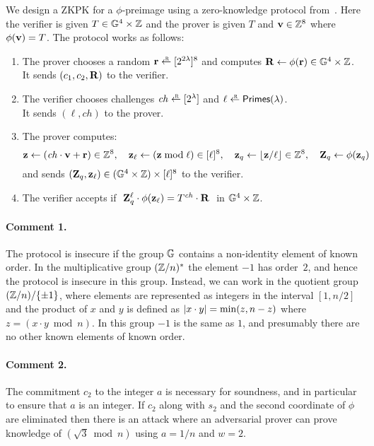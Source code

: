 \documentclass[11pt]{article}
\begin{document}
\begin{itemize}
We design a ZKPK for a $\phi$-preimage 
using a zero-knowledge protocol from~\cite[\S 3.5]{ourpaper}.
Here the verifier is given $T \in \mathbb G^4 \times \mathbb Z$ 
and the prover is given $T$ and $\mathbf{v} \in \mathbb Z^8$
where $\phi(\mathbf{v}) = T$. 
The protocol works as follows:
\begin{enumerate}
\item The prover chooses a random $\rv \rgets \range{2^{2\lambda}}^8$
and computes $\mathbf{R} \gets \phi(\mathbf{r}) \in \mathbb G^4 \times \mathbb Z$. \\
It sends $(c_1, c_2, \mathbf{R})$ to the verifier.

\item The verifier chooses challenges $\mathit{ch} \rgets \range{2^\lambda}$
and $\ell \rgets \primes$. \\
It sends $(\ell, \mathit{ch})$ to the prover.

\item The prover computes:
\[  \mathbf{z} \gets (\mathit{ch} \cdot \mathbf{v} + \mathbf{r}) \in \mathbb Z^8, \quad
    \mathbf{z}_\ell \gets (\mathbf{z} \bmod \ell) \in [{\ell}]^8, \quad
    \mathbf{z}_q \gets \lfloor \mathbf{z} / \ell \rfloor \in \mathbb Z^8, \quad
    \mathbf{Z}_q \gets \phi(\mathbf{z}_q)  
\]
and sends $(\mathbf{Z}_q, \mathbf{z}_\ell) \in (\mathbb G^4 \times \mathbb Z) \times [{\ell}]^8$ 
to the verifier. 

\item The verifier accepts if 
$\ \mathbf{Z}_q^\ell \cdot \phi(\mathbf{z}_\ell) = T^\mathit{ch} \cdot \mathbf{R}\ $ in 
$\mathbb G^4 \times \mathbb Z$.
\end{enumerate}
\end{itemize}


\paragraph{Comment 1.}
The protocol is insecure if the group $\mathbb G$ contains a non-identity
element of known order.  In the multiplicative group $(\mathbb Z/n)^*$ the
element $-1$ has order~$2$, and hence the protocol is insecure in this
group.  Instead, we can work in the quotient group $(\mathbb Z/n)/\{\pm 1\}$, 
where elements are represented as integers in the interval $[1,n/2]$
and the product of $x$ and $y$ is defined as 
$\lvert x \cdot y \rvert = \min(z, n-z)$ where $z = (x \cdot y \bmod n)$.
In this group $-1$ is the same as $1$, and presumably there are
no other known elements of known order.

\paragraph{Comment 2.}
The commitment $c_2$ to the integer $a$ is necessary for soundness,
and in particular to ensure that $a$ is an integer.  If $c_2$ along
with $s_2$ and the second coordinate of $\phi$ are eliminated then there
is an attack where an adversarial prover can prove knowledge of
$(\sqrt{3} \bmod n)$ using $a = 1/n$ and $w = 2$.
\end{document}

